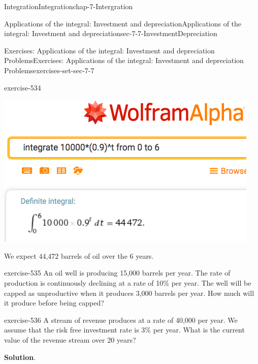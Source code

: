 \documentclass[oneside,10pt,]{book}
\numberwithin{equation}{section}
\begin{document}
\begin{chapterptx}{Integration}{}{Integration}{}{}{chap-7-Intergration}
\begin{sectionptx}{Applications of the integral: Investment and depreciation}{}{Applications of the integral: Investment and depreciation}{}{}{sec-7-7-InvestmentDepreciation}
\begin{exercises-subsection-numberless}{Exercises: Applications of the integral: Investment and depreciation Problems}{}{Exercises: Applications of the integral: Investment and depreciation Problems}{}{}{exercises-set-sec-7-7}
\begin{divisionexercise}{5}{}{}{exercise-534}
\begin{sidebyside}{1}{0.1}{0.1}{0}
\begin{sbspanel}{0.8}
\includegraphics[width=1\linewidth]{images/sec7-7-sol5a.png}
\end{sbspanel}%
\end{sidebyside}%
\par
\hypertarget{p-3063}{}%
We expect 44,472 barrels of oil over the 6 years.%
\end{divisionexercise}%
\begin{divisionexercise}{6}{}{}{exercise-535}%
\hypertarget{p-3064}{}%
An oil well is producing 15,000 barrels per year.  The rate of production is continuously declining at a rate of 10\% per year.  The well will be capped as unproductive when it produces 3,000 barrels per year.  How much will it produce before being capped?%
\end{divisionexercise}%
\begin{divisionexercise}{7}{}{}{exercise-536}%
\hypertarget{p-3065}{}%
A stream of revenue produces at a rate of \textdollar{}40,000 per year.  We assume that the risk free investment rate is 3\% per year.  What is the current value of the revenue stream over 20 years?%
\par\smallskip%
\noindent\textbf{Solution}.\hypertarget{solution-271}{}\quad%
\leavevmode%
\begin{sidebyside}{1}{0.1}{0.1}{0}%
\begin{sbspanel}{0.8}%

\end{sbspanel}
\end{sidebyside}
\end{divisionexercise}
\end{exercises-subsection-numberless}
\end{sectionptx}
\end{chapterptx}
\end{document}
